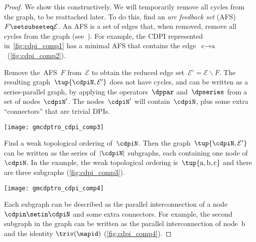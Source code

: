 \begin{proof}
    We show this constructively.
    We will temporarily remove all cycles from the graph, to be reattached later.
    To do this, find an \emph{arc feedback set} (AFS) $F\setsubseteq\mathcal{E}$.
    An AFS is a set of edges that, when removed, remove all cycles from the graph (see~\cite{golovach15incremental}).
    For example, the CDPI represented in~\cref{fig:cdpi_comp1} has a minimal AFS that contains the edge~$\text{c}\rightarrow\text{a}$~(\cref{fig:cdpi_comp2}).

    Remove the~AFS~$F$ from~$\mathcal{E}$ to obtain the reduced edge set~$\mathcal{E}'=\mathcal{E}\backslash F$.
    The resulting graph~$\tup{\cdpiN,\mathcal{E}'} $ does not have cycles, and can be written as a series-parallel graph, by applying the operators~$\dppar$ and~$\dpseries$ from a set of nodes~$\cdpiN'$.
    The nodes~$\cdpiN'$ will contain~$\cdpiN$, plus some extra ``connectors'' that are trivial DPIs.

    \begin{marginfigure}
        \texttt{[image: gmcdptro\_cdpi\_comp3]}
        \caption{}
        \label{fig:cdpi_comp3}
    \end{marginfigure}

    Find a weak topological ordering of~$\cdpiN$.
    Then the graph~$\tup{\cdpiN,\mathcal{E}'} $ can be written as the series of~$|\cdpiN|$ subgraphs, each containing one node of~$\cdpiN$.
    In the example, the weak topological ordering is~$\tup{\text{a},\text{b},\text{c}} $ and there are three subgraphs (\cref{fig:cdpi_comp3}).

    \begin{marginfigure}
        \texttt{[image: gmcdptro\_cdpi\_comp4]}
        \caption{}
        \label{fig:cdpi_comp4}
    \end{marginfigure}

    Each subgraph can be described as the parallel interconnection of a node~$\cdpin\setin\cdpiN$ and some extra connectors.
    For example, the second subgraph in the graph can be written as the parallel interconnection of node~$\text{b}$ and the identity $\triv(\mapid)$ (\cref{fig:cdpi_comp4}).


\end{proof}
